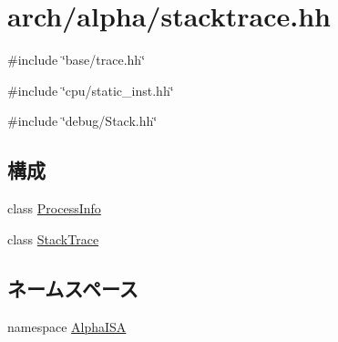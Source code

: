 \hypertarget{alpha_2stacktrace_8hh}{
\section{arch/alpha/stacktrace.hh}
\label{alpha_2stacktrace_8hh}
}
{\ttfamily \#include \char`\"{}base/trace.hh\char`\"{}}\par
{\ttfamily \#include \char`\"{}cpu/static\_\-inst.hh\char`\"{}}\par
{\ttfamily \#include \char`\"{}debug/Stack.hh\char`\"{}}\par
\subsection*{構成}
\begin{DoxyCompactItemize}
\item 
class \hyperlink{classAlphaISA_1_1ProcessInfo}{ProcessInfo}
\item 
class \hyperlink{classAlphaISA_1_1StackTrace}{StackTrace}
\end{DoxyCompactItemize}
\subsection*{ネームスペース}
\begin{DoxyCompactItemize}
\item 
namespace \hyperlink{namespaceAlphaISA}{AlphaISA}
\end{DoxyCompactItemize}

